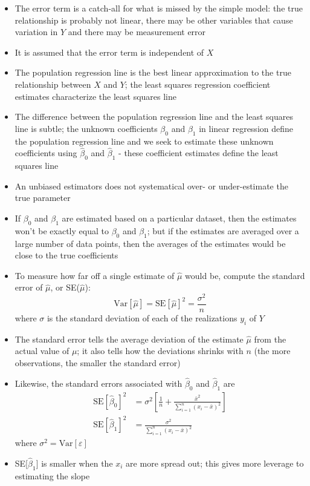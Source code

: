 \documentclass[12pt]{article}
\begin{document}
\begin{itemize}
\item The error term is a catch-all for what is missed by the simple model: the true relationship is probably not linear, there may be other variables that cause variation in $Y$ and there may be measurement error
\item It is assumed that the error term is independent of $X$ 
\item The population regression line is the best linear approximation to the true relationship between $X$ and $Y$; the least squares regression coefficient estimates characterize the least squares line
\item The difference between the population regression line and the least squares line is subtle; the unknown coefficients $\beta_0$ and $\beta_1$ in linear regression define the population regression line and we seek to estimate these unknown coefficients using $\hat{\beta}_0$ and $\hat{\beta}_1$ - these coefficient estimates define the least squares line 
\item An unbiased estimators does not systematical over- or under-estimate the true parameter
\item If $\beta_0$ and $\beta_1$ are estimated based on a particular dataset, then the estimates won't be exactly equal to $\beta_0$ and $\beta_1$; but if the estimates are averaged over a large number of data points, then the averages of the estimates would be close to the true coefficients 
\item  To measure how far off a single estimate of $\hat{\mu}$ would be, compute the standard error of $\hat{\mu}$, or SE($\hat{\mu}$): $$ \text{Var}[\hat{\mu}] = \text{SE}[\hat{\mu}]^2 = \frac{\sigma^2}{n} $$ 
where $\sigma$ is the standard deviation of each of the realizations $y_i$ of $Y$
\item The standard error tells the average deviation of the estimate $\hat{\mu}$ from the actual value of $\mu$; it also tells how the deviations shrinks with $n$ (the more observations, the smaller the standard error)
\item Likewise, the standard errors associated with $\hat{\beta}_0$ and $\hat{\beta}_1$ are $$ \begin{aligned} \text{SE}[\hat{\beta}_0]^2 &= \sigma^2\left[ \frac{1}{n} + \frac{\bar{x}^2}{\sum_{i=1}^n (x_i - \bar{x})^2}\right] \\ \text{SE}[\hat{\beta}_1]^2 &= \frac{\sigma^2}{\sum_{i=1}^n (x_i - \bar{x})^2} \end{aligned} $$ where $\sigma^2 = \text{Var}[\varepsilon]$
\item SE[$\hat{\beta}_1$] is smaller when the $x_i$ are more spread out; this gives more leverage to estimating the slope 

\end{itemize}
\end{document}
